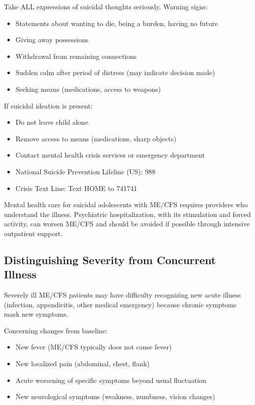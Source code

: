 \begin{practicalwarning}
Take ALL expressions of suicidal thoughts seriously. Warning signs:
\begin{itemize}
    \item Statements about wanting to die, being a burden, having no future
    \item Giving away possessions
    \item Withdrawal from remaining connections
    \item Sudden calm after period of distress (may indicate decision made)
    \item Seeking means (medications, access to weapons)
\end{itemize}

If suicidal ideation is present:
\begin{itemize}
    \item Do not leave child alone
    \item Remove access to means (medications, sharp objects)
    \item Contact mental health crisis services or emergency department
    \item National Suicide Prevention Lifeline (US): 988
    \item Crisis Text Line: Text HOME to 741741
\end{itemize}

Mental health care for suicidal adolescents with ME/CFS requires providers who understand the illness. Psychiatric hospitalization, with its stimulation and forced activity, can worsen ME/CFS and should be avoided if possible through intensive outpatient support.
\end{practicalwarning}

\subsection{Distinguishing Severity from Concurrent Illness}

Severely ill ME/CFS patients may have difficulty recognizing new acute illness (infection, appendicitis, other medical emergency) because chronic symptoms mask new symptoms.

Concerning changes from baseline:
\begin{itemize}
    \item New fever (ME/CFS typically does not cause fever)
    \item New localized pain (abdominal, chest, flank)
    \item Acute worsening of specific symptoms beyond usual fluctuation
    \item New neurological symptoms (weakness, numbness, vision changes)
\end{itemize}

